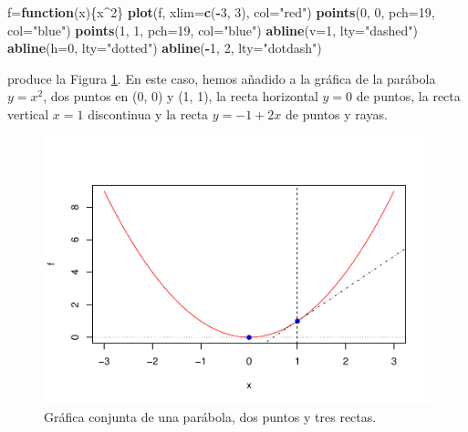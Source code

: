\documentclass[
]{book}
\newenvironment{Shaded}{\begin{snugshade}}{\end{snugshade}}
\newcommand{\ControlFlowTok}[1]{\textcolor[rgb]{0.13,0.29,0.53}{\textbf{#1}}}
\newcommand{\DataTypeTok}[1]{\textcolor[rgb]{0.13,0.29,0.53}{#1}}
\newcommand{\DecValTok}[1]{\textcolor[rgb]{0.00,0.00,0.81}{#1}}
\newcommand{\KeywordTok}[1]{\textcolor[rgb]{0.13,0.29,0.53}{\textbf{#1}}}
\newcommand{\NormalTok}[1]{#1}
\newcommand{\OperatorTok}[1]{\textcolor[rgb]{0.81,0.36,0.00}{\textbf{#1}}}
\newcommand{\StringTok}[1]{\textcolor[rgb]{0.31,0.60,0.02}{#1}}
\theoremstyle{definition}
\theoremstyle{definition}
\theoremstyle{definition}
\theoremstyle{remark}
\begin{document}
\begin{Shaded}
\begin{Highlighting}[]
\NormalTok{f=}\ControlFlowTok{function}\NormalTok{(x)\{x}\OperatorTok{\^{}}\DecValTok{2}\NormalTok{\}}
\KeywordTok{plot}\NormalTok{(f, }\DataTypeTok{xlim=}\KeywordTok{c}\NormalTok{(}\OperatorTok{{-}}\DecValTok{3}\NormalTok{, }\DecValTok{3}\NormalTok{), }\DataTypeTok{col=}\StringTok{"red"}\NormalTok{)}
\KeywordTok{points}\NormalTok{(}\DecValTok{0}\NormalTok{, }\DecValTok{0}\NormalTok{, }\DataTypeTok{pch=}\DecValTok{19}\NormalTok{, }\DataTypeTok{col=}\StringTok{"blue"}\NormalTok{)}
\KeywordTok{points}\NormalTok{(}\DecValTok{1}\NormalTok{, }\DecValTok{1}\NormalTok{, }\DataTypeTok{pch=}\DecValTok{19}\NormalTok{, }\DataTypeTok{col=}\StringTok{"blue"}\NormalTok{)}
\KeywordTok{abline}\NormalTok{(}\DataTypeTok{v=}\DecValTok{1}\NormalTok{, }\DataTypeTok{lty=}\StringTok{"dashed"}\NormalTok{)}
\KeywordTok{abline}\NormalTok{(}\DataTypeTok{h=}\DecValTok{0}\NormalTok{, }\DataTypeTok{lty=}\StringTok{"dotted"}\NormalTok{)}
\KeywordTok{abline}\NormalTok{(}\OperatorTok{{-}}\DecValTok{1}\NormalTok{, }\DecValTok{2}\NormalTok{, }\DataTypeTok{lty=}\StringTok{"dotdash"}\NormalTok{)}
\end{Highlighting}
\end{Shaded}

produce la Figura \ref{fig:F10014}. En este caso, hemos añadido a la gráfica de la parábola \(y=x^2\), dos puntos en (0, 0) y (1, 1), la recta horizontal \(y=0\) de puntos, la recta vertical \(x=1\) discontinua y la recta \(y=-1+2x\) de puntos y rayas.

\begin{figure}

{\centering \includegraphics[width=0.9\linewidth]{07chap06_Graficos_I_files/figure-latex/F10014-1} 

}

\caption{Gráfica conjunta de una parábola, dos puntos y tres rectas.}\label{fig:F10014}
\end{figure}
\end{document}
